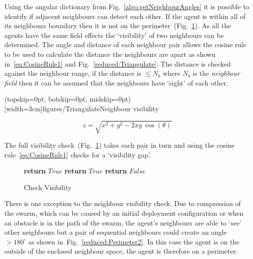 \documentclass{ieeeaccess}
\begin{document}
Using the angular dictionary from Fig.~\ref{algo:getNeighbourAngles} it is possible to identify if adjacent neighbours can detect each other. If the agent is within all of its neighbours boundary then it is not on the perimeter~(Fig.~\ref{algo:CheckVisibility}). 
As all the agents have the same field effects the `visibility' of two neighbours can be determined. The angle and distance of each neighbour pair allows the cosine rule to be used to calculate the distance the neighbours are apart as shown in~\ref{eq:CosineRule1} and Fig.~\ref{reduced:Triangulate}. The distance is checked against the neighbour range, if the distance is $\leq N_b$ where $N_b$ is the \textit{neighbour field} then it can be assumed that the neighbours have `sight' of each other. 

\Figure[t!](topskip=0pt, botskip=0pt, midskip=0pt)[width=3cm]{figures/Triangulate}{Neighbour visibility\label{reduced:Triangulate}}

\begin{equation}
\label{eq:CosineRule1}
z = \sqrt{x^2 + y^2 - 2xy~\cos(\theta)}
\end{equation}

The full visibility check~(Fig.~\ref{algo:CheckVisibility}) takes each pair in turn and using the cosine rule~\ref{eq:CosineRule1} checks for a `visibility gap'. 

\begin{figure}
\begin{algorithmic}[1]
{}
\State\textbf{return} $True$
   \EndIf
{}
\State\textbf{return} $True$
\EndIf
\EndFor
\State\textbf{return} $False$
\EndProcedure
\end{algorithmic}
\caption{Check Visibility}
\label{algo:CheckVisibility}
\end{figure}

There is one exception to the neighbour visibility check. Due to compression of the swarm, which can be caused by an initial deployment configuration or when an obstacle is in the path of the swarm, the agent's neighbours are able to `see' other neighbours but a pair of sequential neighbours could create an angle $> 180^\circ$ as shown in~Fig.~\ref{reduced:Perimeter2}. In this case the agent is on the outside of the enclosed neighbour space, the agent is therefore on a perimeter. 
\end{document}
